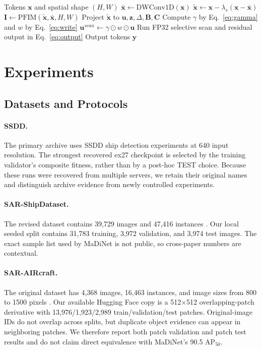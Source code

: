 \documentclass[letterpaper]{article}
\newcommand{\method}{IG-DS-SSM}
\newcommand{\apfifty}{AP$_{50}$}
\begin{document}
\begin{algorithm}[t]
\caption{Implemented \method{} Forward Pass}
\begin{algorithmic}[1]
\REQUIRE Tokens $\mathbf{x}$ and spatial shape $(H,W)$
\STATE $\bar{\mathbf{x}}\leftarrow\mathrm{DWConv1D}(\mathbf{x})$
\STATE $\widetilde{\mathbf{x}}\leftarrow\mathbf{x}-\lambda_s(\mathbf{x}-\bar{\mathbf{x}})$
\STATE $\mathbf{I}\leftarrow\mathrm{PFIM}(\widetilde{\mathbf{x}},\bar{\mathbf{x}},H,W)$
\STATE Project $\widetilde{\mathbf{x}}$ to $\mathbf{u},\mathbf{z},\Delta,\mathbf{B},\mathbf{C}$
\STATE Compute $\gamma$ by Eq.~\ref{eq:gamma} and $w$ by Eq.~\ref{eq:write}
\STATE $\mathbf{u}^{scan}\leftarrow\gamma\odot w\odot\mathbf{u}$
\STATE Run FP32 selective scan and residual output in Eq.~\ref{eq:output}
\RETURN Output tokens $\mathbf{y}$
\end{algorithmic}
\end{algorithm}

\section{Experiments}

\subsection{Datasets and Protocols}

\paragraph{SSDD.}
The primary archive uses SSDD ship detection experiments at 640 input resolution. The strongest recovered ex27 checkpoint is selected by the training validator's composite fitness, rather than by a post-hoc TEST choice. Because these runs were recovered from multiple servers, we retain their original names and distinguish archive evidence from newly controlled experiments.

\paragraph{SAR-ShipDataset.}
The revised dataset contains 39,729 images and 47,416 instances \citep{sarshipdataset,madinet}. Our local seeded split contains 31,783 training, 3,972 validation, and 3,974 test images. The exact sample list used by MaDiNet is not public, so cross-paper numbers are contextual.

\paragraph{SAR-AIRcraft.}
The original dataset has 4,368 images, 16,463 instances, and image sizes from 800 to 1500 pixels \citep{saraircraft,madinet}. Our available Hugging Face copy is a 512$\times$512 overlapping-patch derivative with 13,976/1,923/2,989 train/validation/test patches. Original-image IDs do not overlap across splits, but duplicate object evidence can appear in neighboring patches. We therefore report both patch validation and patch test results and do not claim direct equivalence with MaDiNet's 90.5 \apfifty{}.
\end{document}
